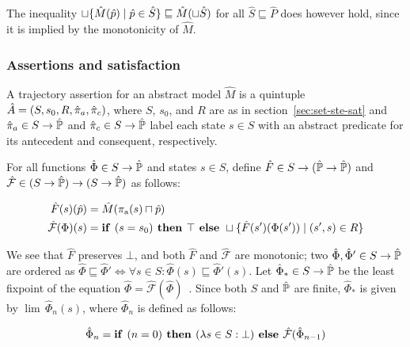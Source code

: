 \noindent The inequality $\sqcup \{ \hat M(\hat p) \mid \hat p \in \hat S \} \sqsubseteq \hat M(\sqcup \hat S)$ for all $\hat S \sqsubseteq \hat P$ does however hold, since it is implied by the monotonicity of $\hat M$.

\subsubsection{Assertions and satisfaction} \label{sec:lat-ste-sat}

A trajectory assertion for an abstract model $\hat M$ is a quintuple $\hat {A} = (S, s_{0}, R, \hat{\pi}_{a}, \hat{\pi}_{c})$, where $S$, $s_{0}$, and $R$ are as in section~\ref{sec:set-ste-sat} and $\hat{\pi}_{a} \in S \rightarrow \hat{\mathbb{P}}$ and $\hat{\pi}_{c} \in S \rightarrow \hat{\mathbb{P}}$ label each state $s \in S$ with an abstract predicate for its antecedent and consequent, respectively. 

For all functions $\hat \Phi \in S \rightarrow \hat{\mathbb{P}}$ and states $s \in S$, define $\hat F \in S \rightarrow (\hat{\mathbb{P}} \rightarrow \hat{\mathbb{P}})$ and $\hat{\mathcal{F}} \in (S \rightarrow \hat{\mathbb{P}}) \rightarrow (S \rightarrow \hat{\mathbb{P}})$ as follows:

\begin{align}
\hat F(s)(\hat p) &= \hat M(\operatorname{\pi_{\textrm{a}}}(s) \sqcap \hat p) \\
\hat{\mathcal{F}}(\Phi)(s) &= \textrm{\textbf{if }} (s = s_{0}) \textrm{\textbf{ then }} \top \textrm{\textbf{ else }} \sqcup \{ \hat F(s')(\Phi(s')) \mid (s',s) \in R \}
\end{align}

\noindent We see that $\hat F$ preserves $\bot$, and both $\hat F$ and $\hat{\mathcal{F}}$ are monotonic; two $\hat \Phi, \hat \Phi' \in S \rightarrow \hat{\mathbb{P}}$ are ordered as $\hat \Phi \sqsubseteq \hat \Phi' \iff \forall s \in S : \hat \Phi(s) \sqsubseteq \hat \Phi'(s)$. Let $\hat \Phi_{*} \in S \rightarrow \hat{\mathbb{P}}$ be the least fixpoint of the equation $\hat \Phi = \hat{\mathcal{F}}(\hat \Phi)$~\cite{davey2002}. Since both $S$ and $\hat{\mathbb{P}}$ are finite, $\hat \Phi_{*}$ is given by $\lim \, \hat \Phi_{n}(s)$, where $\hat \Phi_{n}$ is defined as follows:

\begin{equation}
\hat \Phi_{n} = \textrm{\textbf{if }} (n = 0) \textrm{\textbf{ then }} (\lambda s \in S : \bot) \textrm{\textbf{ else }} \hat{\mathcal{F}}(\hat \Phi_{n-1})
\end{equation}

